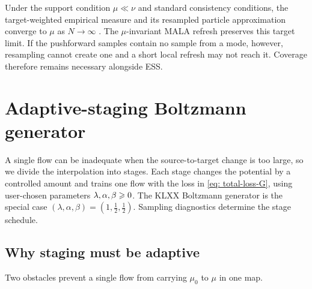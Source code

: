 \documentclass{article}
\begin{document}
Under the support condition $\mu\ll\nu$ and standard consistency conditions, the target-weighted empirical measure and its resampled particle approximation converge to $\mu$ as $N\to\infty$ \citep{liu2001monte,doucet2001introduction}. The $\mu$-invariant MALA refresh preserves this target limit. If the pushforward samples contain no sample from a mode, however, resampling cannot create one and a short local refresh may not reach it. Coverage therefore remains necessary alongside ESS.

\section{Adaptive-staging Boltzmann generator}
\label{sec: boltzmann}

A single flow can be inadequate when the source-to-target change is too large, so we divide the interpolation into stages. Each stage changes the potential by a controlled amount and trains one flow with the loss in \eqref{eq: total-loss-G}, using user-chosen parameters $\lambda,\alpha,\beta\geqslant0$. The KLXX Boltzmann generator is the special case $(\lambda,\alpha,\beta)=(1,\frac12,\frac12)$. Sampling diagnostics determine the stage schedule.

\subsection{Why staging must be adaptive}

Two obstacles prevent a single flow from carrying $\mu_0$ to $\mu$ in one map.
\end{document}
